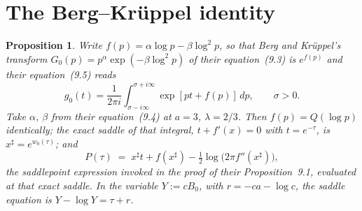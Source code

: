 \documentclass[11pt]{amsart}
\theoremstyle{plain}
\newtheorem{proposition}[theorem]{Proposition}
\theoremstyle{definition}
\theoremstyle{remark}
\begin{document}
\section{The Berg--Kr\"uppel identity}
\label{sec:bk}

\begin{proposition}
\label{prop:bkidentity}
Write $f(p) = \alpha\log p-\beta\log^2 p$, so that Berg and Kr\"uppel's transform $G_0(p) =
p^\alpha\exp(-\beta\log^2 p)$ of their equation~(9.3) is $e^{f(p)}$ and their equation~(9.5) reads
\[
g_0(t) = \frac{1}{2\pi i}\int_{\sigma-i\infty}^{\sigma+i\infty}\exp[pt+f(p)]\,dp, \qquad \sigma>0.
\]
Take $\alpha$, $\beta$ from their equation~(9.4) at $a=3$, $\lambda=2/3$. Then $f(p) = Q(\log p)$
identically; the exact saddle of that integral, $t+f'(x)=0$ with $t = e^{-\tau}$, is $x^\sharp =
e^{w_0(\tau)}$; and
\[
P(\tau) \;=\; x^\sharp t + f(x^\sharp) - \tfrac12\log\bigl(2\pi f''(x^\sharp)\bigr),
\]
the saddlepoint expression invoked in the proof of their Proposition~9.1, evaluated at that exact
saddle. In the variable $Y := cB_0$, with $r = -ca-\log c$, the saddle equation is $Y-\log Y =
\tau+r$.
\end{proposition}
\end{document}
